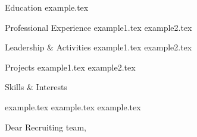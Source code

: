 \documentclass[fontsize=11pt, cvmargins=0.5in, coverlettermargins=1in]{cv_template}
\begin{document}

\begin{cv}
\begin{cvsection}{Education}
    {example.tex}
\end{cvsection}

\begin{cvsection}{Professional Experience}
    {example1.tex}
    {example2.tex}
\end{cvsection}

\begin{cvsection}{Leadership \& Activities}
    {example1.tex}
    {example2.tex}
\end{cvsection}

\begin{cvsection}{Projects}
    {example1.tex}
    {example2.tex}
\end{cvsection}

\begin{cvsection}{Skills \& Interests}
    \begin{cvlist}
        {example.tex}
        {example.tex}
        {example.tex}
    \end{cvlist}
\end{cvsection}
\end{cv}

\begin{coverletter}
  Dear Recruiting team,
  \medskip \newline 
  \lipsum
  \begin{contactdetails}
  \end{contactdetails}
\end{coverletter}
\end{document}
